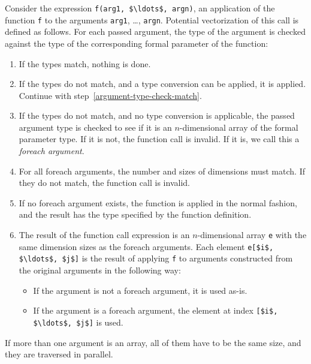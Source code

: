 Consider the expression \lstinline!f(arg1, $\ldots$, argn)!, an application of the function \lstinline!f! to the arguments \lstinline!arg1!, \ldots, \lstinline!argn!.
Potential vectorization of this call is defined as follows.
For each passed argument, the type of the argument is checked against the type of the corresponding formal parameter of the function:
\begin{enumerate}
\item\label{argument-type-check-match}
  If the types match, nothing is done.
\item
  If the types do not match, and a type conversion can be applied, it is applied.
  Continue with step~\ref{argument-type-check-match}.
\item
  If the types do not match, and no type conversion is applicable, the passed argument type is checked to see if it is an $n$-dimensional array of the formal parameter type.
  If it is not, the function call is invalid.
  If it is, we call this a \emph{foreach argument}.
\item
  For all foreach arguments, the number and sizes of dimensions must match.
  If they do not match, the function call is invalid.
\item
  If no foreach argument exists, the function is applied in the normal fashion, and the result has the type specified by the function definition.
\item
  The result of the function call expression is an $n$-dimensional array \lstinline!e! with the same dimension sizes as the foreach arguments.
  Each element \lstinline!e[$i$, $\ldots$, $j$]! is the result of applying \lstinline!f! to arguments constructed from the original arguments in the following way:
\begin{itemize}
\item
  If the argument is not a foreach argument, it is used as-is.
\item
  If the argument is a foreach argument, the element at index \lstinline![$i$, $\ldots$, $j$]! is used.
\end{itemize}
\end{enumerate}

If more than one argument is an array, all of them have to be the same size, and they are traversed in parallel.

